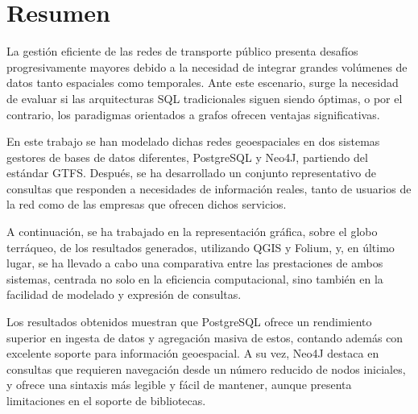 \pagestyle{plain}
\chapter*{Resumen}

La gestión eficiente de las redes de transporte público presenta desafíos progresivamente mayores debido a la necesidad de integrar grandes volúmenes de datos tanto espaciales como temporales. Ante este escenario, surge la necesidad de evaluar si las arquitecturas SQL tradicionales siguen siendo óptimas, o por el contrario, los paradigmas orientados a grafos ofrecen ventajas significativas.

En este trabajo se han modelado dichas redes geoespaciales en dos sistemas gestores de bases de datos diferentes, PostgreSQL y Neo4J, partiendo del estándar GTFS. Después, se ha desarrollado un conjunto representativo de consultas que responden a necesidades de información reales, tanto de usuarios de la red como de las empresas que ofrecen dichos servicios.

A continuación, se ha trabajado en la representación gráfica, sobre el globo terráqueo, de los resultados generados, utilizando QGIS y Folium, y, en último lugar, se ha llevado a cabo una comparativa entre las prestaciones de ambos sistemas, centrada no solo en la eficiencia computacional, sino también en la facilidad de modelado y expresión de consultas.

Los resultados obtenidos muestran que PostgreSQL ofrece un rendimiento superior en ingesta de datos y agregación masiva de estos, contando además con excelente soporte para información geoespacial. A su vez, Neo4J destaca en consultas que requieren navegación desde un número reducido de nodos iniciales, y ofrece una sintaxis más legible y fácil de mantener, aunque presenta limitaciones en el soporte de bibliotecas.
